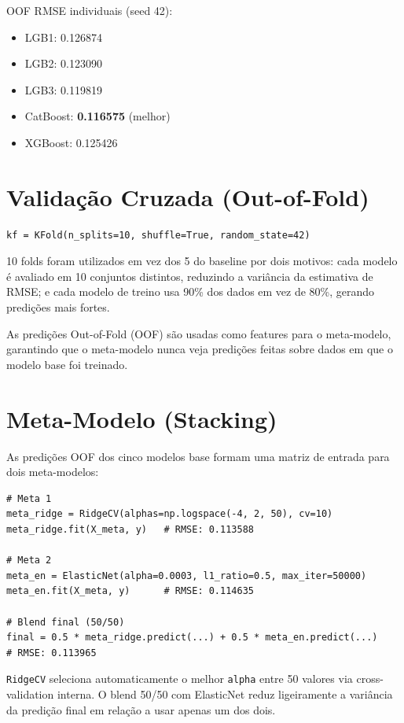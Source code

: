 \documentclass[11pt]{article}
\begin{document}
OOF RMSE individuais (seed 42):
\begin{itemize}
\item LGB1: 0.126874
\item LGB2: 0.123090
\item LGB3: 0.119819
\item CatBoost: \textbf{0.116575} (melhor)
\item XGBoost: 0.125426
\end{itemize}
\section{Validação Cruzada (Out-of-Fold)}
\label{sec:org4bc25e8}

\begin{verbatim}
kf = KFold(n_splits=10, shuffle=True, random_state=42)
\end{verbatim}

10 folds foram utilizados em vez dos 5 do baseline por dois motivos:
cada modelo é avaliado em 10 conjuntos distintos, reduzindo a
variância da estimativa de RMSE; e cada modelo de treino usa 90\% dos
dados em vez de 80\%, gerando predições mais fortes.

As predições Out-of-Fold (OOF) são usadas como features para o
meta-modelo, garantindo que o meta-modelo nunca veja predições feitas
sobre dados em que o modelo base foi treinado.
\section{Meta-Modelo (Stacking)}
\label{sec:org3c95745}

As predições OOF dos cinco modelos base formam uma matriz de entrada
para dois meta-modelos:

\begin{verbatim}
# Meta 1
meta_ridge = RidgeCV(alphas=np.logspace(-4, 2, 50), cv=10)
meta_ridge.fit(X_meta, y)   # RMSE: 0.113588

# Meta 2
meta_en = ElasticNet(alpha=0.0003, l1_ratio=0.5, max_iter=50000)
meta_en.fit(X_meta, y)      # RMSE: 0.114635

# Blend final (50/50)
final = 0.5 * meta_ridge.predict(...) + 0.5 * meta_en.predict(...)
# RMSE: 0.113965
\end{verbatim}

\texttt{RidgeCV} seleciona automaticamente o melhor \texttt{alpha} entre 50 valores
via cross-validation interna. O blend 50/50 com ElasticNet reduz
ligeiramente a variância da predição final em relação a usar apenas um
dos dois.
\end{document}
